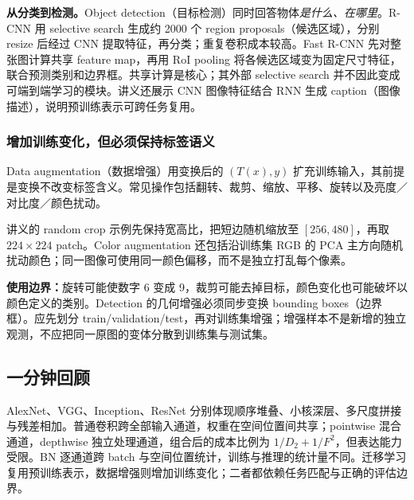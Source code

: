 \textbf{从分类到检测。}Object detection（目标检测）同时回答物体\emph{是什么、在哪里}。R-CNN 用 selective search 生成约 2000 个 region proposals（候选区域），分别 resize 后经过 CNN 提取特征，再分类；重复卷积成本较高。Fast R-CNN 先对整张图计算共享 feature map，再用 RoI pooling 将各候选区域变为固定尺寸特征，联合预测类别和边界框。共享计算是核心；其外部 selective search 并不因此变成可端到端学习的模块。讲义还展示 CNN 图像特征结合 RNN 生成 caption（图像描述），说明预训练表示可跨任务复用。

\subsubsection{增加训练变化，但必须保持标签语义}

Data augmentation（数据增强）用变换后的 $(T(x),y)$ 扩充训练输入，其前提是变换不改变标签含义。常见操作包括翻转、裁剪、缩放、平移、旋转以及亮度／对比度／颜色扰动。

讲义的 random crop 示例先保持宽高比，把短边随机缩放至 $[256,480]$，再取 $224\times224$ patch。Color augmentation 还包括沿训练集 RGB 的 PCA 主方向随机扰动颜色；同一图像可使用同一颜色偏移，而不是独立打乱每个像素。

\textbf{使用边界：}旋转可能使数字 6 变成 9，裁剪可能去掉目标，颜色变化也可能破坏以颜色定义的类别。Detection 的几何增强必须同步变换 bounding boxes（边界框）。应先划分 train/validation/test，再对训练集增强；增强样本不是新增的独立观测，不应把同一原图的变体分散到训练集与测试集。

\subsection{一分钟回顾}

AlexNet、VGG、Inception、ResNet 分别体现顺序堆叠、小核深层、多尺度拼接与残差相加。普通卷积跨全部输入通道，权重在空间位置间共享；pointwise 混合通道，depthwise 独立处理通道，组合后的成本比例为 $1/D_2+1/F^2$，但表达能力受限。BN 逐通道跨 batch 与空间位置统计，训练与推理的统计量不同。迁移学习复用预训练表示，数据增强则增加训练变化；二者都依赖任务匹配与正确的评估边界。
